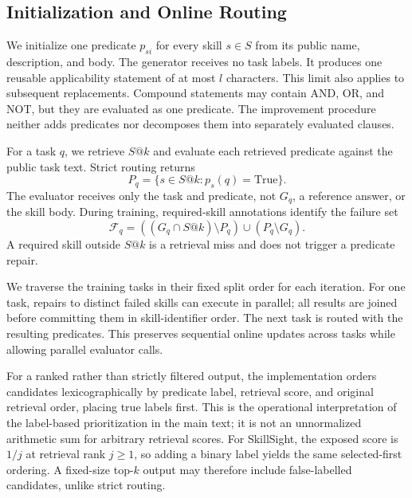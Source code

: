\subsection{Initialization and Online Routing}
\label{app:procedure-routing}
We initialize one predicate $p_{si}$ for every skill $s\in S$ from its public name, description, and body. The generator receives no task labels. It produces one reusable applicability statement of at most $l$ characters. This limit also applies to subsequent replacements. Compound statements may contain AND, OR, and NOT, but they are evaluated as one predicate. The improvement procedure neither adds predicates nor decomposes them into separately evaluated clauses.

For a task $q$, we retrieve $S@k$ and evaluate each retrieved predicate against the public task text. Strict routing returns
\[
P_q=\{s\in S@k:p_s(q)=\mathrm{True}\}.
\]
The evaluator receives only the task and predicate, not $G_q$, a reference answer, or the skill body. During training, required-skill annotations identify the failure set
\[
\mathcal F_q=((G_q\cap S@k)\setminus P_q)
\cup(P_q\setminus G_q).
\]
A required skill outside $S@k$ is a retrieval miss and does not trigger a predicate repair.

We traverse the training tasks in their fixed split order for each iteration. For one task, repairs to distinct failed skills can execute in parallel; all results are joined before committing them in skill-identifier order. The next task is routed with the resulting predicates. This preserves sequential online updates across tasks while allowing parallel evaluator calls.

For a ranked rather than strictly filtered output, the implementation orders candidates lexicographically by predicate label, retrieval score, and original retrieval order, placing true labels first. This is the operational interpretation of the label-based prioritization in the main text; it is not an unnormalized arithmetic sum for arbitrary retrieval scores. For SkillSight, the exposed score is $1/j$ at retrieval rank $j\geq1$, so adding a binary label yields the same selected-first ordering. A fixed-size top-$k$ output may therefore include false-labelled candidates, unlike strict routing.
